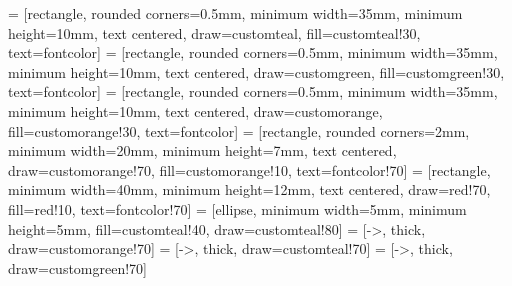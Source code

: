  = [rectangle, rounded corners=0.5mm, minimum width=35mm, minimum height=10mm, text centered, draw=customteal, fill=customteal!30, text=fontcolor]
 = [rectangle, rounded corners=0.5mm, minimum width=35mm, minimum height=10mm, text centered, draw=customgreen, fill=customgreen!30, text=fontcolor]
 = [rectangle, rounded corners=0.5mm, minimum width=35mm, minimum height=10mm, text centered, draw=customorange, fill=customorange!30, text=fontcolor]
 = [rectangle, rounded corners=2mm, minimum width=20mm, minimum height=7mm, text centered, draw=customorange!70, fill=customorange!10, text=fontcolor!70]
 = [rectangle, minimum width=40mm, minimum height=12mm, text centered, draw=red!70, fill=red!10, text=fontcolor!70]
 = [ellipse, minimum width=5mm, minimum height=5mm, fill=customteal!40, draw=customteal!80]
 = [->, thick, draw=customorange!70]
 = [->, thick, draw=customteal!70]
 = [->, thick, draw=customgreen!70]


